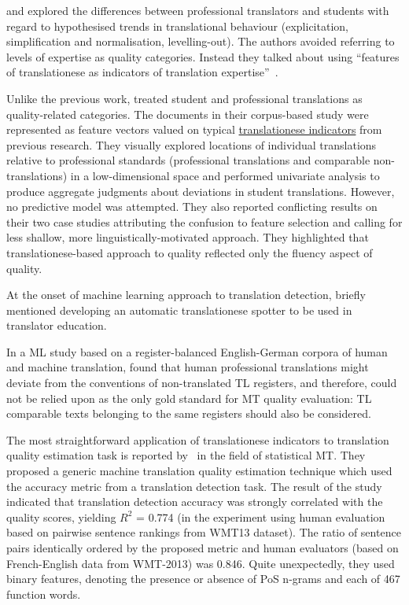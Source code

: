 \citet{Redelinghuys2015} and \citet{Redelinghuys2016} explored the differences between professional translators and students with regard to hypothesised trends in translational behaviour (explicitation, simplification and normalisation, levelling-out). The authors avoided referring to levels of expertise as quality categories. Instead they talked about using ``features of translationese as indicators of translation expertise''~\cite[p.192]{Redelinghuys2016}. 

Unlike the previous work, \citet{Sutter2017} treated student and professional translations as quality-related categories. The documents in their corpus-based study were represented as feature vectors valued on typical \hyperlink{wd:sutters}{translationese indicators} from previous research. They visually explored locations of individual translations relative to professional standards (professional translations and comparable non-translations) in a low-dimensional space and performed univariate analysis to produce aggregate judgments about deviations in student translations. However, no predictive model was attempted. They also reported conflicting results on their two case studies attributing the confusion to feature selection and calling for less shallow, more linguistically-motivated approach. They highlighted that translationese-based approach to quality reflected only the fluency aspect of quality.

At the onset of machine learning approach to translation detection, \citet{Baroni2006} briefly mentioned developing an automatic translationese spotter to be used in translator education. 

In a ML study based on a register-balanced English-German corpora of human and machine translation, \citet{Lapshinova2015} found that human professional translations might deviate from the conventions of non-translated TL registers, and therefore, could not be relied upon as the only gold standard for MT quality evaluation: TL comparable texts belonging to the same registers should also be considered. 

The most straightforward application of translationese indicators to translation quality estimation task is reported by~\citet{Aharoni2014} in the field of statistical MT. They proposed a generic machine translation quality estimation technique which used the accuracy metric from a translation detection task. The result of the study indicated that translation detection accuracy was strongly correlated with the quality scores, yielding $R^2$ = 0.774 (in the experiment using human evaluation based on pairwise sentence rankings from WMT13 dataset). The ratio of sentence pairs identically ordered by the proposed metric and human evaluators (based on French-English data from \gls{WMT}-2013) was 0.846. Quite unexpectedly, they used binary features, denoting the presence or absence of PoS n-grams and each of 467 function words.

